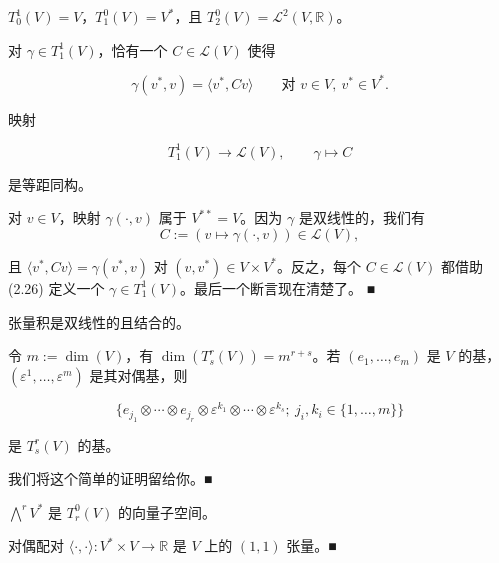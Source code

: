 \begin{remark}

\begin{items}
\item

$ T^1_0(V) = V $，$ T^0_1(V) = V^* $，且 $ T^0_2(V) = \mathcal{L}^2(V, \mathbb{R}) $。

\item

对 $ \gamma \in T^1_1(V) $，恰有一个 $ C \in \mathcal{L}(V) $ 使得

\begin{equation}
\gamma(v^*, v) = \langle v^*, Cv \rangle \qquad \text{对 } v \in V,\ v^* \in V^* .\tag{2.26}
\end{equation}

映射

\[
T^1_1(V) \to \mathcal{L}(V), \qquad \gamma \mapsto C
\]

是等距同构。

\proofhead
对 $ v \in V $，映射 $ \gamma(\cdot, v) $ 属于 $ V^{\ast\ast} = V $。因为 $ \gamma $ 是双线性的，我们有
\[
C := (v \mapsto \gamma(\cdot, v)) \in \mathcal{L}(V) ,
\]

且 $ \langle v^*, Cv \rangle = \gamma(v^*, v) $ 对 $ (v, v^*) \in V \times V^* $。反之，每个 $ C \in \mathcal{L}(V) $ 都借助 (2.26) 定义一个 $ \gamma \in T^1_1(V) $。最后一个断言现在清楚了。 \nobreak\hspace{0.35em}■

\item

张量积是双线性的且结合的。

\item

令 $ m := \dim(V) $，有 $ \dim(T^r_s(V)) = m^{r+s} $。若 $ (e_1, \ldots, e_m) $ 是 $ V $ 的基，$ (\varepsilon^1, \ldots, \varepsilon^m) $ 是其对偶基，则

\[
\{ e_{j_1} \otimes \cdots \otimes e_{j_r} \otimes \varepsilon^{k_1} \otimes \cdots \otimes \varepsilon^{k_s} ;\ j_i, k_i \in \{1, \ldots, m\} \}
\]

是 $ T^r_s(V) $ 的基。

\proofhead
我们将这个简单的证明留给你。\nobreak\hspace{0.35em}■
\item

$ \bigwedge^{r}V^{*} $ 是 $ T_{r}^{0}(V) $ 的向量子空间。

\item

对偶配对 $ \langle\cdot,\cdot\rangle: V^{*}\times V \to \mathbb{R} $ 是 $ V $ 上的 $ (1,1) $ 张量。\nobreak\hspace{0.35em}■

\end{items}

\end{remark}

